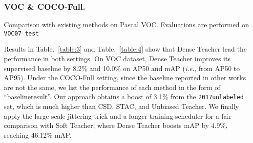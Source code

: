 \documentclass[runningheads]{llncs}
\begin{document}
\subsubsection{VOC \& COCO-Full.}

\begin{table}[tb]
	\begin{center}
		\caption{Comparison with existing methods on Pascal VOC. Evaluations are performed on \texttt{VOC07 test}}
		\label{table:3}
		\scalebox{0.9}{
		
		}
	\end{center}
\end{table}
Results in Table.~\ref{table:3} and Table.~\ref{table:4} show that Dense Teacher lead the performance in both settings. On VOC dataset, Dense Teacher improves its supervised baseline by 8.2\% and 10.0\% on AP50 and mAP (\emph{i.e.}, from AP50 to AP95). Under the COCO-Full setting, since the baseline reported in other works are not the same, we list the performance of each method in the form of ``baselineresult''. Our approach obtains a boost of 3.1\% from the \texttt{2017unlabeled} set, which is much higher than CSD, STAC, and Unbiased Teacher. We finally apply the large-scale jittering trick and a longer training scheduler for a fair comparison with Soft Teacher, where Dense Teacher boosts mAP by 4.9\%, reaching 46.12\% mAP.
\setlength{\tabcolsep}{5pt}
\begin{table}[h]
	\begin{center}
		\caption{Experimental results on COCO-Full. Evaluations are done on COCO \texttt{val2017}. Note that 1x represents 90K training iterations, x represents x90K iterations.  means training with large scale jittering}
		\label{table:4}
	\end{center}
\end{table}
\end{document}
